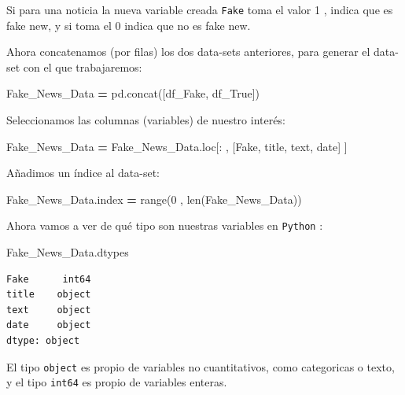 \documentclass[
  11pt,
  a4paper,
]{article}
\newenvironment{Shaded}{\begin{snugshade}}{\end{snugshade}}
\newcommand{\BuiltInTok}[1]{#1}
\newcommand{\DecValTok}[1]{\textcolor[rgb]{0.00,0.00,0.81}{#1}}
\newcommand{\NormalTok}[1]{#1}
\newcommand{\OperatorTok}[1]{\textcolor[rgb]{0.81,0.36,0.00}{\textbf{#1}}}
\newcommand{\StringTok}[1]{\textcolor[rgb]{0.31,0.60,0.02}{#1}}
\begin{document}
Si para una noticia la nueva variable creada \texttt{Fake} toma el valor
1 , indica que es fake new, y si toma el 0 indica que no es fake new.

Ahora concatenamos (por filas) los dos data-sets anteriores, para
generar el data-set con el que trabajaremos:

\begin{Shaded}
\begin{Highlighting}[]
\NormalTok{Fake\_News\_Data }\OperatorTok{=}\NormalTok{ pd.concat([df\_Fake, df\_True])}
\end{Highlighting}
\end{Shaded}

Seleccionamos las columnas (variables) de nuestro interés:

\begin{Shaded}
\begin{Highlighting}[]
\NormalTok{Fake\_News\_Data }\OperatorTok{=}\NormalTok{ Fake\_News\_Data.loc[: , [}\StringTok{\textquotesingle{}Fake\textquotesingle{}}\NormalTok{, }\StringTok{\textquotesingle{}title\textquotesingle{}}\NormalTok{, }\StringTok{\textquotesingle{}text\textquotesingle{}}\NormalTok{, }\StringTok{\textquotesingle{}date\textquotesingle{}}\NormalTok{] ]}
\end{Highlighting}
\end{Shaded}

Añadimos un índice al data-set:

\begin{Shaded}
\begin{Highlighting}[]
\NormalTok{Fake\_News\_Data.index }\OperatorTok{=} \BuiltInTok{range}\NormalTok{(}\DecValTok{0}\NormalTok{ , }\BuiltInTok{len}\NormalTok{(Fake\_News\_Data))}
\end{Highlighting}
\end{Shaded}

Ahora vamos a ver de qué tipo son nuestras variables en \texttt{Python}
:

\begin{Shaded}
\begin{Highlighting}[]
\NormalTok{Fake\_News\_Data.dtypes}
\end{Highlighting}
\end{Shaded}

\begin{verbatim}
Fake      int64
title    object
text     object
date     object
dtype: object
\end{verbatim}

El tipo \texttt{object} es propio de variables no cuantitativos, como
categoricas o texto, y el tipo \texttt{int64} es propio de variables
enteras.
\end{document}
